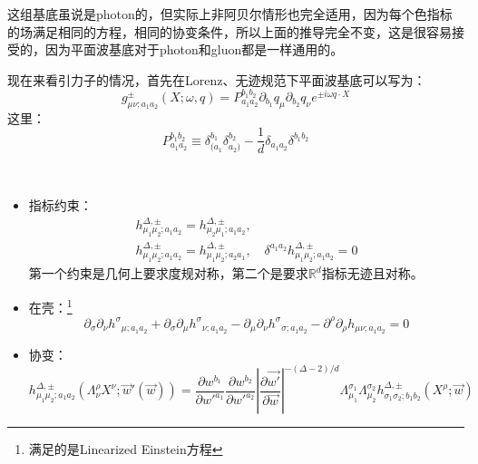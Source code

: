 这组基底虽说是photon的，但实际上非阿贝尔情形也完全适用，因为每个色指标的场满足相同的方程，相同的协变条件，所以上面的推导完全不变，这是很容易接受的，因为平面波基底对于photon和gluon都是一样通用的。

现在来看引力子的情况，首先在Lorenz、无迹规范下平面波基底可以写为：
\begin{equation}
	g_{\mu\nu;a_1a_2}^{\pm}(X;\omega,q)=P_{a_1a_2}^{b_1b_2}\partial_{b_1}q_\mu\partial_{b_2}q_\nu e^{\pm i\omega q\cdot X}
\end{equation}
这里：
\begin{equation}
	P_{a_1a_2}^{b_1b_2}\equiv\delta_{(a_1}^{b_1}\delta_{a_2)}^{b_2}-\frac{1}{d}\delta_{a_1a_2}\delta^{b_1b_2}
\end{equation}
\begin{definition}
	~
	\begin{itemize}
		\item 指标约束：
		\begin{equation}
			\begin{array}{l}h_{\mu_1\mu_2;a_1a_2}^{\Delta,\pm}=h_{\mu_2\mu_1;a_1a_2}^{\Delta,\pm},\\h_{\mu_1\mu_2;a_1a_2}^{\Delta,\pm}=h_{\mu_1\mu_2;a_2a_1}^{\Delta,\pm},\quad\delta^{a_1a_2}h_{\mu_1\mu_2;a_1a_2}^{\Delta,\pm}=0\end{array}
		\end{equation}
		第一个约束是几何上要求度规对称，第二个是要求$\mathbb{R}^d$指标无迹且对称。
		\item 在壳：\footnote{满足的是Linearized Einstein方程}
		\begin{equation}
			\partial_\sigma\partial_\nu {h^\sigma}_{\mu;a_1a_2}+\partial_\sigma\partial_\mu {h^\sigma}_{\nu;a_1a_2}-\partial_\mu\partial_\nu {h^\sigma}_{\sigma;a_1a_2}-\partial^\rho\partial_\rho h_{\mu\nu;a_1a_2}=0
		\end{equation}
		\item 协变：
		\begin{equation}
			h_{\mu_1\mu_2;a_1a_2}^{\Delta,\pm}\left(\Lambda_{\nu}^{\rho}X^{\nu};\vec{w}'(\vec{w})\right)=\frac{\partial w^{b_1}}{\partial w'^{a_1}}\frac{\partial w^{b_2}}{\partial w'^{a_2}}\left|\frac{\partial\vec{w'}}{\partial\vec{w}}\right|^{-(\Delta-2)/d}\Lambda_{\mu_1}^{\sigma_1}\Lambda_{\mu_2}^{\sigma_2}h_{\sigma_1\sigma_2;b_1b_2}^{\Delta,\pm}(X^\rho;\vec{w})
		\end{equation}
	\end{itemize}
\end{definition}

